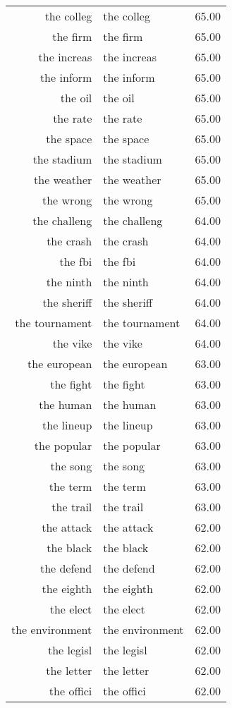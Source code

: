 \begin{table}[ht]
\begin{tabular}{rlr}
  the colleg & the colleg & 65.00 \\ 
  the firm & the firm & 65.00 \\ 
  the increas & the increas & 65.00 \\ 
  the inform & the inform & 65.00 \\ 
  the oil & the oil & 65.00 \\ 
  the rate & the rate & 65.00 \\ 
  the space & the space & 65.00 \\ 
  the stadium & the stadium & 65.00 \\ 
  the weather & the weather & 65.00 \\ 
  the wrong & the wrong & 65.00 \\ 
  the challeng & the challeng & 64.00 \\ 
  the crash & the crash & 64.00 \\ 
  the fbi & the fbi & 64.00 \\ 
  the ninth & the ninth & 64.00 \\ 
  the sheriff & the sheriff & 64.00 \\ 
  the tournament & the tournament & 64.00 \\ 
  the vike & the vike & 64.00 \\ 
  the european & the european & 63.00 \\ 
  the fight & the fight & 63.00 \\ 
  the human & the human & 63.00 \\ 
  the lineup & the lineup & 63.00 \\ 
  the popular & the popular & 63.00 \\ 
  the song & the song & 63.00 \\ 
  the term & the term & 63.00 \\ 
  the trail & the trail & 63.00 \\ 
  the attack & the attack & 62.00 \\ 
  the black & the black & 62.00 \\ 
  the defend & the defend & 62.00 \\ 
  the eighth & the eighth & 62.00 \\ 
  the elect & the elect & 62.00 \\ 
  the environment & the environment & 62.00 \\ 
  the legisl & the legisl & 62.00 \\ 
  the letter & the letter & 62.00 \\ 
  the offici & the offici & 62.00 \\ 

\end{tabular}
\end{table}
